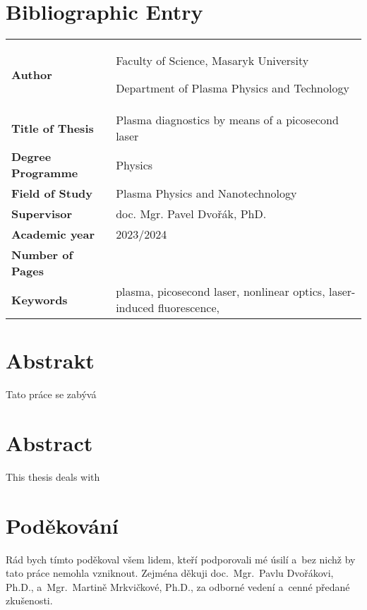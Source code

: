 \chapter*{Bibliographic Entry}
\thispagestyle{empty}
\bgroup
\renewcommand{\arraystretch}{\bibentryspacing}
\begin{tabularx}{\textwidth}{l X}
	\textbf{Author}           & \theauthor\par
	                            Faculty of Science, Masaryk University\par
	                            Department of Plasma Physics and Technology \\
	\textbf{Title of Thesis}  & Plasma diagnostics by means of a picosecond laser \\
	\textbf{Degree Programme} & Physics \\
	\textbf{Field of Study}   & Plasma Physics and Nanotechnology \\
	\textbf{Supervisor}       & doc. Mgr. Pavel Dvořák, PhD. \\
	\textbf{Academic year}    & 2023/2024 \\
	\textbf{Number of Pages}  & \pageref*{lastpage} \\
	\textbf{Keywords}         & plasma, picosecond laser,
	                            nonlinear optics,
	                            laser-induced fluorescence,
	                            \EFISH{} \\
\end{tabularx}
\egroup

\chapter*{Abstrakt}
Tato práce se zabývá %
\vfill
{\let\clearpage\relax\chapter*{Abstract}}
\thispagestyle{empty}
This thesis deals with %

\cleardoublepage


\chapter*{Poděkování}
Rád bych tímto poděkoval všem lidem, kteří podporovali mé úsilí
a~bez nichž by tato práce nemohla vzniknout.
Zejména děkuji doc.~Mgr.~Pavlu Dvořákovi, Ph.D.,
a~Mgr.~Martině Mrkvičkové, Ph.D.,
za odborné vedení a~cenné předané zkušenosti.

